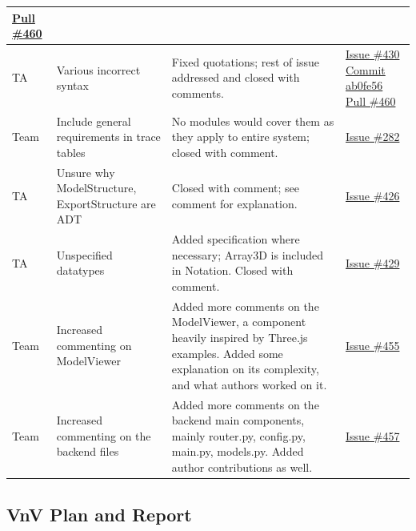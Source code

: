 \documentclass[12pt, titlepage]{article}
\begin{document}
\begin{longtable}{|p{2cm}|p{4cm}|p{5cm}|p{3cm}|}
\newline\href{https://github.com/OmarHassanAdelhamid/Five-of-a-Kind-capstone-project-/pull/460}{Pull \#460} \\ \hline
TA & Various incorrect syntax & Fixed quotations; rest of issue addressed and closed with comments. & \href{https://github.com/OmarHassanAdelhamid/Five-of-a-Kind-capstone-project-/issues/430}{Issue \#430}
\newline\href{https://github.com/OmarHassanAdelhamid/Five-of-a-Kind-capstone-project-/pull/460/commits/ab0fe5610fd5f6aec7be4830c39b80b6081480b5}{Commit ab0fe56}
\newline\href{https://github.com/OmarHassanAdelhamid/Five-of-a-Kind-capstone-project-/pull/460}{Pull \#460} \\ \hline
Team & Include general requirements in trace tables & No modules would cover them as they apply to entire system; closed with comment. & \href{https://github.com/OmarHassanAdelhamid/Five-of-a-Kind-capstone-project-/issues/282}{Issue \#282} \\ \hline
TA & Unsure why ModelStructure, ExportStructure are ADT & Closed with comment; see comment for explanation. & \href{https://github.com/OmarHassanAdelhamid/Five-of-a-Kind-capstone-project-/issues/426}{Issue \#426} \\ \hline
TA & Unspecified datatypes & Added specification where necessary; Array3D is included in Notation. Closed with comment. & \href{https://github.com/OmarHassanAdelhamid/Five-of-a-Kind-capstone-project-/issues/429}{Issue \#429} \\ \hline
Team & Increased commenting on ModelViewer & Added more comments on the ModelViewer, a component heavily inspired by Three.js examples. Added some explanation on its complexity, and what authors worked on it. & \href{https://github.com/OmarHassanAdelhamid/Five-of-a-Kind-capstone-project-/issues/455}{Issue \#455} \\ \hline
Team & Increased commenting on the backend files & Added more comments on the backend main components, mainly router.py, config.py, main.py, models.py. Added author contributions as well. & \href{https://github.com/OmarHassanAdelhamid/Five-of-a-Kind-capstone-project-/issues/457}{Issue \#457} \\ \hline

\end{longtable}

\subsection{VnV Plan and Report}
\end{document}
